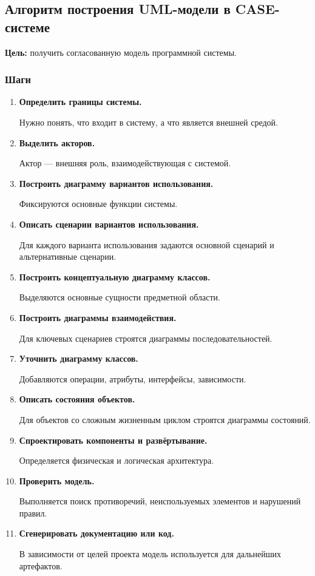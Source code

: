 \documentclass[12pt,a4paper]{article}
\begin{document}
\subsection{Алгоритм построения UML-модели в CASE-системе}

\textbf{Цель:} получить согласованную модель программной системы.

\subsubsection*{Шаги}

\begin{enumerate}
    \item \textbf{Определить границы системы.}

    Нужно понять, что входит в систему, а что является внешней средой.

    \item \textbf{Выделить акторов.}

    Актор --- внешняя роль, взаимодействующая с системой.

    \item \textbf{Построить диаграмму вариантов использования.}

    Фиксируются основные функции системы.

    \item \textbf{Описать сценарии вариантов использования.}

    Для каждого варианта использования задаются основной сценарий и альтернативные сценарии.

    \item \textbf{Построить концептуальную диаграмму классов.}

    Выделяются основные сущности предметной области.

    \item \textbf{Построить диаграммы взаимодействия.}

    Для ключевых сценариев строятся диаграммы последовательностей.

    \item \textbf{Уточнить диаграмму классов.}

    Добавляются операции, атрибуты, интерфейсы, зависимости.

    \item \textbf{Описать состояния объектов.}

    Для объектов со сложным жизненным циклом строятся диаграммы состояний.

    \item \textbf{Спроектировать компоненты и развёртывание.}

    Определяется физическая и логическая архитектура.

    \item \textbf{Проверить модель.}

    Выполняется поиск противоречий, неиспользуемых элементов и нарушений правил.

    \item \textbf{Сгенерировать документацию или код.}

    В зависимости от целей проекта модель используется для дальнейших артефактов.
\end{enumerate}
\end{document}
